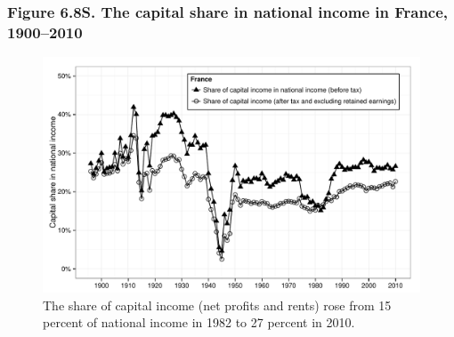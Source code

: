 \documentclass[t]{beamer}\usepackage[]{graphicx}\usepackage[]{color}
\newenvironment{knitrout}{}{} %
\begin{document}
\begin{frame}[label=Figure_6_8S]
\frametitle{Figure 6.8S. The capital share in national income in France, 1900--2010}
\begin{figure}[t]
\begin{minipage}[b]{\textwidth}
\centering
\begin{knitrout}\footnotesize
{}\color{fgcolor}

{\centering \includegraphics[width=1\linewidth]{figures/bw/Figure_6_8S} 

}



\end{knitrout}
\caption{The share of capital income (net profits and rents) rose from 15 percent of national income in 1982 to 27 percent in 2010.}
\end{minipage}
\end{figure}
\end{frame}
\end{document}
